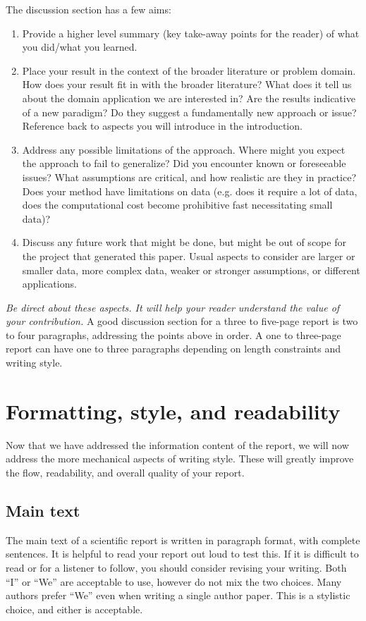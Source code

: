 \documentclass[]{article}
\begin{document}
The discussion section has a few aims:
\begin{enumerate}
    \item Provide a higher level summary (key take-away points for the reader) of what you did/what you learned.
    \item Place your result in the context of the broader literature or problem domain. How does your result fit in with the broader literature? What does it tell us about the domain application we are interested in? Are the results indicative of a new paradigm? Do they suggest a fundamentally new approach or issue? Reference back to aspects you will introduce in the introduction.
    \item Address any possible limitations of the approach. Where might you expect the approach to fail to generalize? Did you encounter known or foreseeable issues?
          What assumptions are critical, and how realistic are they in practice? Does your method have limitations on data (e.g. does it require a lot of data, does the computational cost become prohibitive fast necessitating small data)?
    \item Discuss any future work that might be done, but might be out of scope for the project that generated this paper. Usual aspects to consider are larger or smaller data, more complex data, weaker or stronger assumptions, or different applications.
\end{enumerate}

\emph{Be direct about these aspects. It will help your reader understand the value of your contribution.}
A good discussion section for a three to five-page report is two to four paragraphs, addressing the points above in order. A one to three-page report can have one to three paragraphs depending on length constraints and writing style.

\section{Formatting, style, and readability}

Now that we have addressed the information content of the report, we will now address the more mechanical aspects of writing style. These will greatly improve the flow, readability, and overall quality of your report.

\subsection{Main text}
The main text of a scientific report is written in paragraph format, with complete sentences. It is helpful to read your report out loud to test this. If it is difficult to read or for a listener to follow, you should consider revising your writing. Both ``I'' or ``We'' are acceptable to use, however do not mix the two choices. Many authors prefer ``We'' even when writing a single author paper. This is a stylistic choice, and either is acceptable.
\end{document}
